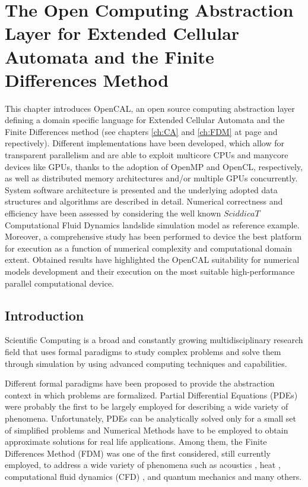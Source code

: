 \chapter{The Open Computing Abstraction Layer for Extended
Cellular Automata and the Finite Differences Method}

This chapter introduces OpenCAL, an open source computing
  abstraction layer defining a domain specific language for Extended
  Cellular Automata and the Finite Differences method (see chapters \ref{ch:CA} and \ref{ch:FDM} at page \pageref{ch:CA} and \pageref{ch:FDM} repectively). 
  Different implementations have been developed, which allow for transparent
  parallelism and are able to exploit multicore CPUs and manycore
  devices like GPUs, thanks to the adoption of OpenMP and OpenCL,
  respectively, as well as distributed memory architectures and/or multiple GPUs concurrently.
   System software architecture is presented and the
  underlying adopted data structures and algorithms are described in
  detail. Numerical correctness and efficiency have been assessed by
  considering the well known $SciddicaT$ Computational Fluid Dynamics
  landslide simulation model as reference example.  
  Moreover, a comprehensive study has been performed to device the best platform
  for execution as a function of numerical complexity and
  computational domain extent. Obtained results have highlighted the
  OpenCAL suitability for numerical models development and their execution on
  the most suitable high-performance parallel computational device.
  
\section{Introduction}
\label{sec:opencal_introduction}
 Scientific Computing \cite{golub2014scientific} is a broad and
  constantly growing multidisciplinary research field that uses formal
  paradigms to study complex problems and solve them through
  simulation by using advanced computing techniques and capabilities.
  
   Different formal paradigms have been proposed to provide the
  abstraction context in which problems are formalized. Partial
  Differential Equations (PDEs) were probably the first to be largely
  employed for describing a wide variety of phenomena. Unfortunately,
  PDEs can be analytically solved only for a small set of simplified
  problems \cite{Mazumder20161} and Numerical Methods have to be
  employed to obtain approximate solutions for real life applications. Among
  them, the Finite Differences Method (FDM) was one of the first
  considered, still currently employed, to address a wide variety of
  phenomena such as acoustics \cite{Chaigne19941112, Branski2014},
  heat \cite{Rana2012212, Sahin200619}, computational fluid dynamics
  (CFD) \cite{Chang1990317, Deng201390}, and quantum mechanics
  \cite{Hu2015640, Farrokhabadi201467} and many others.
  
